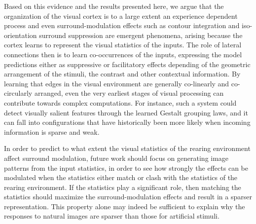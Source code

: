 Based on this evidence and the results presented here, we argue that
the organization of the visual cortex is to a large extent an
experience dependent process and even surround-modulation effects such
as contour integration and iso-orientation surround suppression are
emergent phenomena, arising because the cortex learns to represent the
visual statistics of the inputs. The role of lateral connections then
is to learn co-occurrences of the inputs, expressing the model
predictions either as suppressive or facilitatory effects depending of
the geometric arrangement of the stimuli, the contrast and other
contextual information. By learning that edges in the visual
environment are generally co-linearly and co-circularly arranged, even
the very earliest stages of visual processing can contribute towards
complex computations.  For instance, such a system could detect
visually salient features through the learned Gestalt grouping laws,
and it can fall into configurations that have historically been more
likely when incoming information is sparse and weak.

In order to predict to what extent the visual statistics of the
rearing environment affect surround modulation, future
work should focus on generating image patterns from the input
statistics, in order to see how strongly the effects can be modulated
when the statistics either match or clash with the statistics of the
rearing environment. If the statistics play a significant role, then
matching the statistics should maximize the surround-modulation
effects and result in a sparser representation. This property alone
may indeed be sufficient to explain why the responses to natural
images are sparser than those for artificial stimuli.

